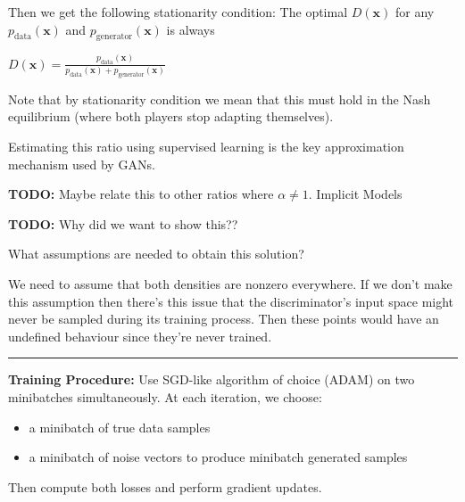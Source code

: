 \documentclass[a2paper,8pt]{extarticle}
\renewcommand{\vec}[1]{\mathbf{#1}}
\newcommand{\vx}{\vec{x}}
\newcommand{\todo}[1]{\textbf{TODO:} #1}
\newcommand{\todo}[1]{%
}
\newcommand{\sep}{\vspace{0pt}\noindent\hrule\vspace{0pt}}
\newcommand{\sep}{\vspace{5pt}\noindent\hrule\vspace{5pt}}
\begin{document}
\begin{landscape}
\begin{multicols*}{7}

Then we get the following stationarity
condition: The optimal $D(\vx)$ for any $p_{\text{data}}(\vx)$ and
$p_{\text{generator}}(\vx)$ is always

$
D(\vx)
=
\frac{p_{\text{data}}(\vx)}{p_{\text{data}}(\vx) + p_{\text{generator}}(\vx)}
$

Note that by stationarity condition we mean that this must hold in the
Nash equilibrium (where both players stop adapting themselves).

Estimating this ratio using supervised learning is the key approximation
mechanism used by GANs.

\todo{Maybe relate this to other ratios where $\alpha\neq 1$. Implicit Models}

\todo{Why did we want to show this??}

What assumptions are needed to obtain this solution?

We need to assume that both densities are nonzero everywhere. If we don't make
this assumption then there's this issue that the discriminator's input space
might never be sampled during its training process. Then these points would have
an undefined behaviour since they're never trained.

\sep

\textbf{Training Procedure:} Use SGD-like algorithm of choice (ADAM) on two
minibatches simultaneously. At each iteration, we choose:
\begin{itemize}
  \item a minibatch of true data samples
  \item a minibatch of noise vectors to produce minibatch generated samples
\end{itemize}
Then compute both losses and perform gradient updates.


\end{multicols*}
\end{landscape}
\end{document}
